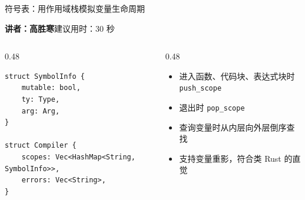 \documentclass[aspectratio=169]{ctexbeamer}
\newcommand{\speaker}[2]{%
    \vspace{-0.4em}
    \begin{flushright}
        \scriptsize\color{mainblue}\textbf{讲者：#1}\quad 建议用时：#2
    \end{flushright}
    \vspace{-0.7em}
}
\begin{document}
\begin{frame}[fragile]{符号表：用作用域栈模拟变量生命周期}
    \speaker{高胜寒}{30 秒}
    \begin{columns}[T]
    \begin{column}{0.48\textwidth}
        \begin{lstlisting}[style=tinycode]
struct SymbolInfo {
    mutable: bool,
    ty: Type,
    arg: Arg,
}

struct Compiler {
    scopes: Vec<HashMap<String, SymbolInfo>>,
    errors: Vec<String>,
}
        \end{lstlisting}
    \end{column}
    \begin{column}{0.48\textwidth}
        \begin{itemize}
            \item 进入函数、代码块、表达式块时 \texttt{push\_scope}
            \item 退出时 \texttt{pop\_scope}
            \item 查询变量时从内层向外层倒序查找
            \item 支持变量重影，符合类 Rust 的直觉
        \end{itemize}
    \end{column}
    \end{columns}
\end{frame}
\end{document}
